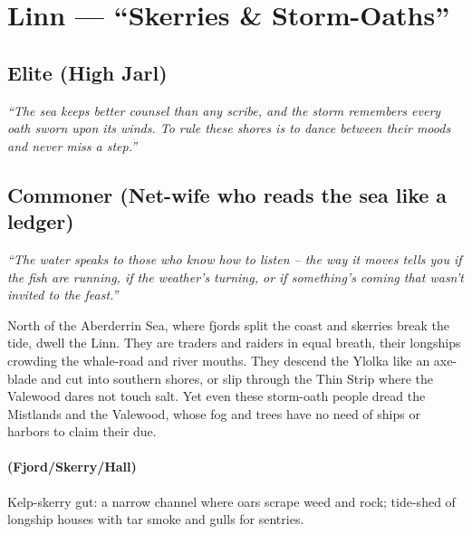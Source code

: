 \section{Linn --- ``Skerries \& Storm-Oaths''}
\label{chap:linn}

\subsection*{Elite (High Jarl)}
\textit{``The sea keeps better counsel than any scribe, and the storm remembers every oath sworn upon its winds. To rule these shores is to dance between their moods and never miss a step.''}

\subsection*{Commoner (Net-wife who reads the sea like a ledger)}
\textit{``The water speaks to those who know how to listen – the way it moves tells you if the fish are running, if the weather's turning, or if something's coming that wasn't invited to the feast.''}

\begin{tcolorbox}[colback=black!3,colframe=black!40!white,title={Theme \& Atmosphere}]
North of the Aberderrin Sea, where fjords split the coast and skerries break the tide, dwell the Linn. They are traders and raiders in equal breath, their longships crowding the whale-road and river mouths. They descend the Ylolka like an axe-blade and cut into southern shores, or slip through the Thin Strip where the Valewood dares not touch salt. Yet even these storm-oath people dread the Mistlands and the Valewood, whose fog and trees have no need of ships or harbors to claim their due.
\end{tcolorbox}

\paragraph*{(Fjord/Skerry/Hall)} Kelp-skerry gut: a narrow channel where oars scrape weed and rock; tide-shed of longship houses with tar smoke and gulls for sentries.


